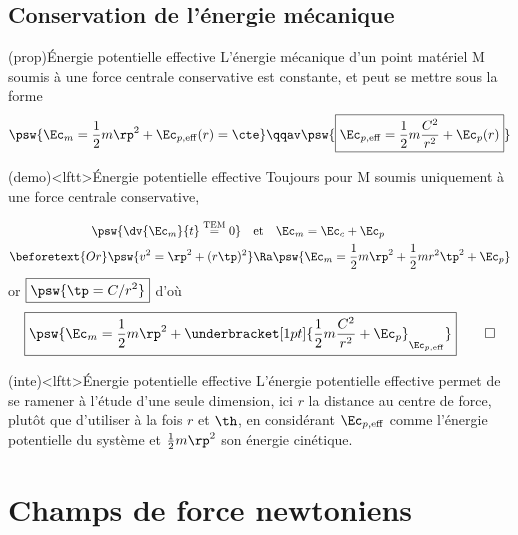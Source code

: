 \documentclass[../../main/main.tex]{subfiles}
\begin{document}
\subsection{Conservation de l'énergie mécanique}

\begin{tcb*}(prop){Énergie potentielle effective}
  L'énergie mécanique d'un point matériel M soumis à une force centrale
  conservative est constante, et peut se mettre sous la forme
      \[
      \psw{
        \Ec_m = \frac{1}{2}m \rp^{2} + \Ec_{p,\rm eff}(r) = \cte
      }
      \qqav
      \psw{
        \boxed{\Ec_{p,\rm eff} = \frac{1}{2}m \frac{C^2}{r^2} + \Ec_p(r)}
      }
    \]
\end{tcb*}

\begin{tcb*}(demo)<lftt>{Énergie potentielle effective}
  Toujours pour M soumis uniquement à une force centrale conservative,
  \smallbreak
  \begin{isd}[righthand ratio=.4]
    \begin{align*}
    \psw{\dv{\Ec_m}{t} \overset{\rm TEM}{=} 0}
    \quad & \text{et} \quad 
    \Ec_m = \Ec_c + \Ec_p
    \\
    \beforetext{Or}
    \psw{v^2   = \rp^2 + (r\tp)^2}
          & \Ra
    \psw{\Ec_m = \frac{1}{2}m\rp^2 + \frac{1}{2}mr^2\tp^2 + \Ec_p}
    \end{align*}
    \tcblower
  or $\boxed{\psw{\tp = C/r^2}}$ d'où
  \begin{gather*}
    \boxed{
      \psw{
        \Ec_m = \frac{1}{2}m\rp^2 +
        \underbracket[1pt]{\frac{1}{2}m \frac{C^2}{r^2}+\Ec_p}_{\Ec_{p,\rm eff}}
      }
    }
    \qed
  \end{gather*}
  \end{isd}
\end{tcb*}

\begin{tcb*}(inte)<lftt>{Énergie potentielle effective}
L'énergie potentielle effective permet de se ramener à l'étude d'une seule
dimension, ici $r$ la distance au centre de force, plutôt que d'utiliser à la
fois $r$ et $\th$, en considérant $\Ec_{p,\rm eff}$ comme l'énergie potentielle
du système et $\frac{1}{2}m \rp^{2}$ son énergie cinétique.
\end{tcb*}

\section{Champs de force newtoniens}
\end{document}
